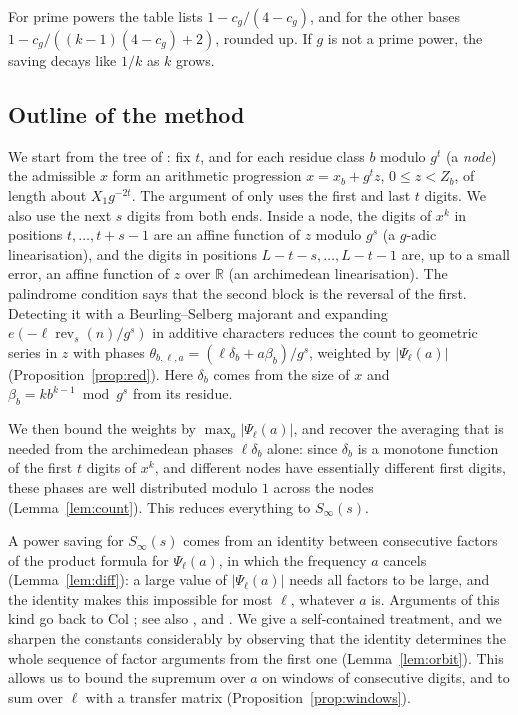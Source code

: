 \documentclass[11pt]{amsart}
\theoremstyle{definition}
\numberwithin{equation}{section}
\newcommand{\rev}{\operatorname{rev}}
\newcommand{\R}{\mathbb{R}}
\newcommand{\Sinf}{S_\infty}
\begin{document}
For prime powers the table lists $1-c_g/(4-c_g)$, and for the other bases
$1-c_g/((k-1)(4-c_g)+2)$, rounded up. If $g$ is not a prime power, the saving decays
like $1/k$ as $k$ grows.

\subsection{Outline of the method}
We start from the tree of \cite{CLS}: fix $t$, and for each residue class $b$
modulo $g^t$ (a \emph{node}) the admissible $x$ form an arithmetic
progression $x=x_b+g^tz$, $0\le z<Z_b$, of length about $X_1g^{-2t}$. The
argument of \cite{CLS} only uses the first and last $t$ digits. We also use
the next $s$ digits from both ends. Inside a node, the digits of $x^k$ in
positions $t,\dots,t+s-1$ are an affine function of $z$ modulo $g^s$
(a $g$-adic linearisation), and the digits in positions
$L-t-s,\dots,L-t-1$ are, up to a small error, an affine function of $z$
over $\R$ (an archimedean linearisation). The palindrome condition says
that the second block is the reversal of the first. Detecting it with a
Beurling--Selberg majorant and expanding $e(-\ell\rev_s(n)/g^s)$ in
additive characters reduces the count to geometric series in $z$ with
phases $\theta_{b,\ell,a}=(\ell\delta_b+a\beta_b)/g^s$, weighted by
$|\Psi_\ell(a)|$ (Proposition~\ref{prop:red}). Here $\delta_b$ comes from
the size of $x$ and $\beta_b=kb^{k-1}\bmod g^s$ from its residue.

We then bound the weights by $\max_a|\Psi_\ell(a)|$, and recover the
averaging that is needed from the archimedean phases $\ell\delta_b$ alone:
since $\delta_b$ is a monotone function of the first $t$ digits of $x^k$,
and different nodes have essentially different first digits, these phases
are well distributed modulo $1$ across the nodes
(Lemma~\ref{lem:count}). This reduces everything to $\Sinf(s)$.

A power saving for $\Sinf(s)$ comes from an identity between consecutive
factors of the product formula for $\Psi_\ell(a)$, in which the frequency
$a$ cancels (Lemma~\ref{lem:diff}): a large value of $|\Psi_\ell(a)|$ needs
all factors to be large, and the identity makes this impossible for most
$\ell$, whatever $a$ is. Arguments of this kind go back to Col
\cite{Col}; see also \cite{TP}, \cite[Section~2.3]{DMRSS} and \cite{BhS}. We
give a self-contained treatment, and we sharpen the constants considerably
by observing that the identity determines the whole sequence of factor
arguments from the first one (Lemma~\ref{lem:orbit}). This allows us to
bound the supremum over $a$ on windows of consecutive digits, and to sum
over $\ell$ with a transfer matrix (Proposition~\ref{prop:windows}).
\end{document}
